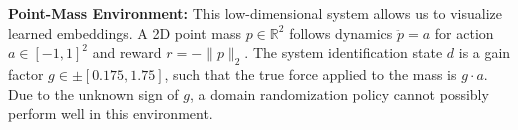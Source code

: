 \documentclass{article}
\newcommand{\R}{\mathbb{R}}
\newcommand{\TODO}[1]{\textcolor{red}{\textbf{TODO: #1}}}
\newcommand{\blind}{\emph{blind}}
\newcommand{\plain}{\emph{plain}}
\newcommand{\embed}{\emph{ours}}
\newcommand{\obvar}{z}
\newcommand{\idvar}{d}
\begin{document}
\textbf{Point-Mass Environment:}
\label{pointmass}
This low-dimensional system allows us to visualize learned embeddings.
A 2D point mass $p \in \R^2$ follows dynamics $\ddot p = a$ for action $a \in [-1,1]^2$ and reward $r = -\|p\|_2$.
The system identification state $\idvar$ is a gain factor $g \in \pm[0.175, 1.75]$,
such that the true force applied to the mass is $g \cdot a$.
Due to the unknown sign of $g$, a domain randomization policy cannot possibly perform well in this environment.
%
%

%
\end{document}
